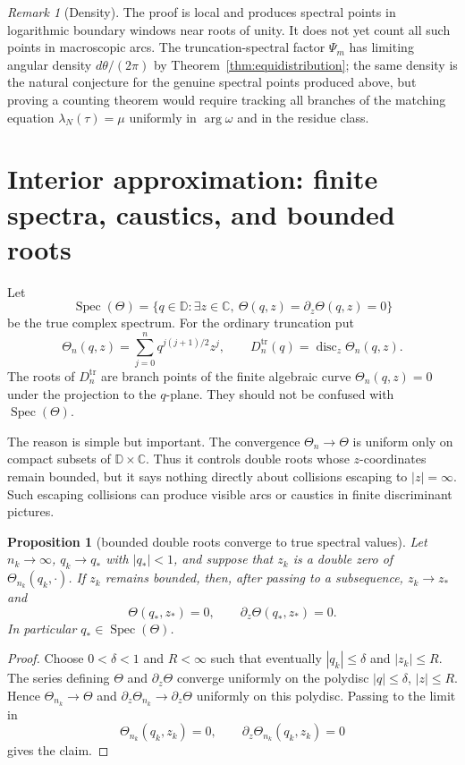 \documentclass[11pt,a4paper,reqno]{amsart}
\newtheorem{proposition}[theorem]{Proposition}
\theoremstyle{remark}
\newtheorem{remark}[theorem]{Remark}
\newcommand{\C}{\mathbb C}
\newcommand{\D}{\mathbb D}
\newcommand{\Spec}{\operatorname{Spec}}
\newcommand{\disc}{\operatorname{disc}}
\newcommand{\Th}{\Theta}
\newcommand{\tr}{\mathrm{tr}}
\begin{document}
\begin{remark}[Density]
The proof is local and produces spectral points in logarithmic boundary windows near roots of unity.  It does not yet count all such points in macroscopic arcs.  The truncation-spectral factor $\Psi_m$ has limiting angular density $d\theta/(2\pi)$ by Theorem~\ref{thm:equidistribution}; the same density is the natural conjecture for the genuine spectral points produced above, but proving a counting theorem would require tracking all branches of the matching equation $\lambda_N(\tau)=\mu$ uniformly in $\arg\omega$ and in the residue class.
\end{remark}

\section{Interior approximation: finite spectra, caustics, and bounded roots}
Let
\[
  \Spec(\Th)=\{q\in\D:\exists z\in\C,\ \Th(q,z)=\partial_z\Th(q,z)=0\}
\]
be the true complex spectrum.  For the ordinary truncation put
\[
  \Th_n(q,z)=\sum_{j=0}^{n}q^{j(j+1)/2}z^j,
  \qquad D_n^{\tr}(q)=\disc_z\Th_n(q,z).
\]
The roots of $D_n^{\tr}$ are branch points of the finite algebraic curve $\Th_n(q,z)=0$ under the projection to the $q$-plane.  They should not be confused with $\Spec(\Th)$.

The reason is simple but important.  The convergence $\Th_n\to\Th$ is uniform only on compact subsets of $\D\times\C$.  Thus it controls double roots whose $z$-coordinates remain bounded, but it says nothing directly about collisions escaping to $|z|=\infty$.  Such escaping collisions can produce visible arcs or caustics in finite discriminant pictures.

\begin{proposition}[bounded double roots converge to true spectral values]\label{prop:bounded}
Let $n_k\to\infty$, $q_k\to q_*$ with $|q_*|<1$, and suppose that $z_k$ is a double zero of $\Th_{n_k}(q_k,\cdot)$.  If $z_k$ remains bounded, then, after passing to a subsequence, $z_k\to z_*$ and
\[
  \Th(q_*,z_*)=0,\qquad \partial_z\Th(q_*,z_*)=0.
\]
In particular $q_*\in\Spec(\Th)$.
\end{proposition}

\begin{proof}
Choose $0<\delta<1$ and $R<\infty$ such that eventually $|q_k|\leq\delta$ and $|z_k|\leq R$.  The series defining $\Th$ and $\partial_z\Th$ converge uniformly on the polydisc $|q|\leq\delta$, $|z|\leq R$.  Hence $\Th_{n_k}\to\Th$ and $\partial_z\Th_{n_k}\to\partial_z\Th$ uniformly on this polydisc.  Passing to the limit in
\[
  \Th_{n_k}(q_k,z_k)=0,
  \qquad
  \partial_z\Th_{n_k}(q_k,z_k)=0
\]
gives the claim.
\end{proof}
\end{document}
